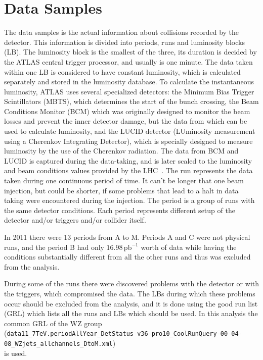 \chapter{Data Samples}
\label{sec:DataSamples}

The data samples is the actual information about collisions recorded by the detector. This information is divided into periods, runs and luminosity blocks (LB). The luminosity block is the smallest of the three, its duration is decided by the ATLAS central trigger processor, and usually is one minute. The data taken within one LB is considered to have constant luminosity, which is calculated separately and stored in the luminosity database. To calculate the instantaneous luminosity, ATLAS uses several specialized detectors: the Minimum  Bias Trigger Scintillators (MBTS), which determines the start of the bunch crossing, the Beam Conditions Monitor (BCM) which was originally designed to monitor the beam losses and prevent the inner detector damage, but the data from which can be used to calculate luminosity, and the LUCID detector (LUminosity measurement using a Cherenkov Integrating Detector), which is specially designed to measure luminosity by the use of the Cherenkov radiation. The data from BCM and LUCID is captured during the data-taking, and is later scaled to the luminosity and beam conditions values provided by the LHC~\cite{lib:lumi}. The run represents the data taken during one continuous period of time. It can't be longer that one beam injection, but could be shorter, if some problems that lead to a halt in data taking were encountered during the injection. The period is a group of runs with the same detector conditions. Each period represents different setup of the detector and/or triggers and/or collider itself.

In 2011 there were 13 periods from A to M. Periods A and C were not physical runs, and the period B had only \ensuremath{16.98\,\mathrm{pb}^{-1}} worth of data while having the conditions substantially different from all the other runs and thus was excluded from the analysis.

During some of the runs there were discovered problems with the detector or with the triggers, which compromised the data. The LBs during which these problems occur should be excluded from the analysis, and it is done using the good run list (GRL) which lists all the runs and LBs which should be used. In this analysis the common GRL of the WZ group\\
(\texttt{\footnotesize data11\_7TeV.periodAllYear\_DetStatus-v36-pro10\_CoolRunQuery-00-04-08\_WZjets\_allchannels\_DtoM.xml})\\
is used.

